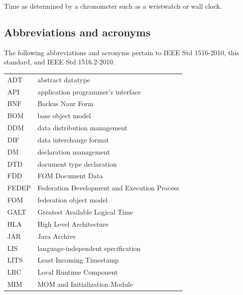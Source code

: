  Time as determined by a chronometer such as a wristwatch or wall clock.

\subsection{Abbreviations and acronyms}

The following abbreviations and acronyms pertain to IEEE Std 1516-2010, this standard, and IEEE Std 1516.2-2010.

\begin{tabular}{@{}p{0.95in}p{4.8in}@{}}
    ADT   & abstract datatype                            \\
    API   & application programmer's interface           \\
    BNF   & Backus Naur Form                             \\
    BOM   & base object model                            \\
    DDM   & data distribution management                 \\
    DIF   & data interchange format                      \\
    DM    & declaration management                       \\
    DTD   & document type declaration                    \\
    FDD   & FOM Document Data                            \\
    FEDEP & Federation Development and Execution Process \\
    FOM   & federation object model                      \\
    GALT  & Greatest Available Logical Time              \\
    HLA   & High Level Architecture                      \\
    JAR   & Java Archive                                 \\
    LIS   & language-independent specification           \\
    LITS  & Least Incoming Timestamp                     \\
    LRC   & Local Runtime Component                      \\
    MIM   & MOM and Initialization Module                \\
\end{tabular}

